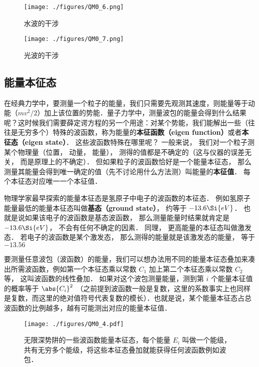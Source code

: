 \begin{figure}[ht]
\centering
\texttt{[image: ./figures/QM0\_6.png]}
\caption{水波的干涉} \label{QM0_fig6}
\end{figure}

\begin{figure}[ht]
\centering
\texttt{[image: ./figures/QM0\_7.png]}
\caption{光波的干涉} \label{QM0_fig7}
\end{figure}


\subsection{能量本征态}
在经典力学中，要测量一个粒子的能量，我们只需要先观测其速度，则能量等于动能（$mv^2/2$）加上该位置的势能．量子力学中，测量波包的能量会得到什么结果呢？这时候我们需要薛定谔方程的另一个用途：对某个势能，我们能解出一些（往往是无穷多个）特殊的波函数，称为能量的\textbf{本征函数（eigen function）}或者\textbf{本征态（eigen state）}． 这些波函数特殊在哪里呢？ 一般来说， 我们对一个粒子测某个物理量（位置， 动量， 能量）， 测得的值都是不确定的（这与仪器的误差无关， 而是原理上的不确定）． 但如果粒子的波函数恰好是一个能量本征态， 那么测量其能量会得到唯一确定的值（先不讨论用什么方法测）叫能量的\textbf{本征值}． 每个本征态对应唯一一个本征值．

物理学家最早探索的能量本征态是氢原子中电子的波函数的本征态． 例如氢原子能量最低的能量本征态叫做\textbf{基态（ground state）}， 约等于 $-13.6\Si{eV}$． 也就是说如果该电子的波函数是基态波函数， 那么测量能量时结果就肯定是 $-13.6\Si{eV}$， 不会有任何不确定的因素． 同理， 更高能量的本征态叫做激发态． 若电子的波函数是某个激发态， 那么测得的能量就是该激发态的能量， 等于 $-13.56$

要测量任意波包（波函数）的能量，我们可以想办法用不同的能量本征态叠加来凑出所需波函数，例如第一个本征态乘以常数 $C_1$ 加上第二个本征态乘以常数 $C_2$ 等， 这叫波函数的线性叠加． 如果对这个波包测量能量，测到第 $i$ 个能量本征值的概率等于 $\abs{C_i}^2$ （之前提到波函数一般是复数，这里的系数事实上也同样是复数，而这里的绝对值符号代表复数的模长）．也就是说，某个能量本征态占总波函数的比例越多，越有可能测出对应的能量本征值．


\begin{figure}[ht]
\centering
\texttt{[image: ./figures/QM0\_4.pdf]}
\caption{无限深势阱的一些波函数能量本征态，每个能量 $E_i$ 叫做一个能级，共有无穷多个能级，将这些本征态叠加就能获得任何波函数例如波包．} \label{QM0_fig4}
\end{figure}


